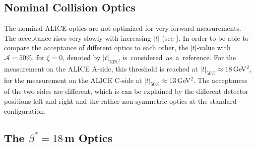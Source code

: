\subsection{Nominal Collision Optics}
%
The nominal ALICE optics are not optimized for very forward measurements. The acceptance rises very slowly with increasing $|t|$ (see ). In order to be able to compare the acceptance of different optics to each other, the $|t|$-value with $\mathcal{A}=50\%$, for $\xi=0$, denoted by $|t|_{50\%}$, \mbox{is considered as a reference}. For the measurement on the ALICE A-side, this threshold is reached at $|t|_{50\%} \approx 18\,$GeV$^2$, for the measurement on the ALICE C-side at $|t|_{50\%} \approx 13 \,$GeV$^2$. The acceptances of the two sides are different, which is can be explained by the different detector positions left and right and the rather non-symmetric optics at the standard configuration.

\subsection{The $\beta^*=18\,$m Optics}

